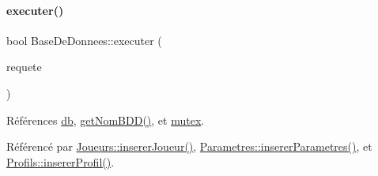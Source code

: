 \paragraph{\texorpdfstring{executer()}{executer()}}
{\footnotesize\ttfamily bool Base\+De\+Donnees\+::executer (\begin{DoxyParamCaption}\item[{Q\+String}]{requete }\end{DoxyParamCaption})}



Références \hyperlink{class_base_de_donnees_a3e738dcf443370c46a541677ab619f06}{db}, \hyperlink{class_base_de_donnees_a467909531ae3cdebaf173f6e97cdc624}{get\+Nom\+B\+D\+D()}, et \hyperlink{class_base_de_donnees_aa1b4696fac87a740f914aa73739086f2}{mutex}.



Référencé par \hyperlink{class_joueurs_ad41325dbd0611773c6e9fd8a814be1b3}{Joueurs\+::inserer\+Joueur()}, \hyperlink{class_parametres_a0102cadfb1bce5a8e82d6c12661fccf8}{Parametres\+::inserer\+Parametres()}, et \hyperlink{class_profils_ae560041d0af81c5b77a8448d78122d04}{Profils\+::inserer\+Profil()}.


